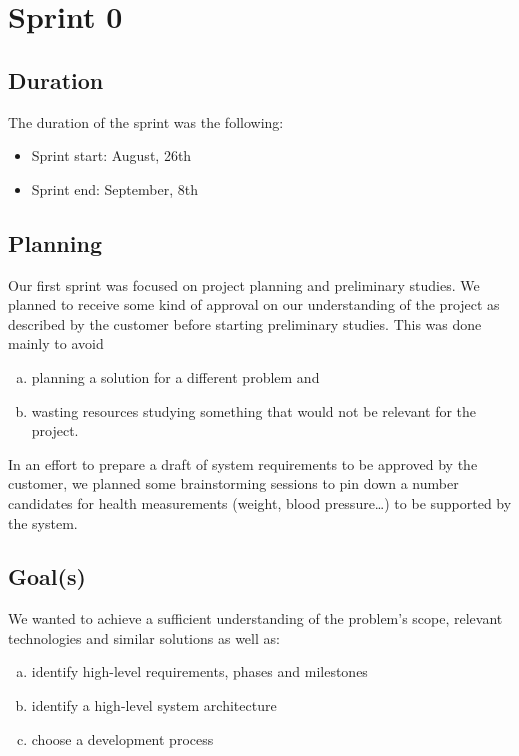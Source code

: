 
\chapter{Sprint 0}
\label{Sprint0}

\section{Duration}
The duration of the sprint was the following:
\begin{itemize}
\item Sprint start: August, 26th
\item Sprint end: September, 8th
\end{itemize}

\section{Planning}

Our first sprint was focused on project planning and preliminary studies.
We planned to receive some kind of approval on our understanding of the project
as described by the customer before starting preliminary studies. This was done mainly to avoid
\begin{enumerate}[a)]
\item planning a solution for a different problem and
\item wasting resources studying something that would not be relevant for the project.
\end{enumerate}
In an effort to prepare a draft of system requirements to be approved by the customer,
we planned some brainstorming sessions to pin down a number candidates for health measurements
(weight, blood pressure\ldots) to be supported by the system.

\section{Goal(s)}

We wanted to achieve a sufficient understanding of the problem's scope,
relevant technologies and similar solutions as well as:%
\begin{enumerate}[a)]
\item identify high-level requirements, phases and milestones
\item identify a high-level system architecture
\item choose a development process
\end{enumerate}

